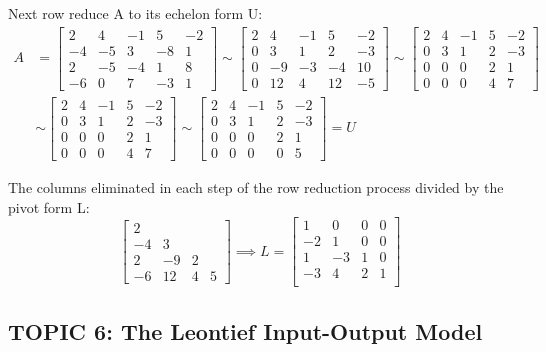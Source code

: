 \documentclass[12pt]{article} %
\begin{document}
Next row reduce A to its echelon form U:
\begin{align*}
	A &= \begin{bmatrix}
		2 & 4 & -1 & 5 & -2\\
		-4 & -5 & 3 & -8 & 1\\
		2 & -5 & -4 & 1 & 8\\
		-6 & 0 & 7 & -3 & 1
	\end{bmatrix} \sim \begin{bmatrix}
		2 & 4 & -1 & 5 & -2\\
		0 & 3 & 1 & 2 & -3\\
		0 & -9 & -3 & -4 & 10\\
		0 & 12 & 4 & 12 & -5
	\end{bmatrix} \sim \begin{bmatrix}
		2 & 4 & -1 & 5 & -2\\
		0 & 3 & 1 & 2 & -3\\
		0 & 0 & 0 & 2 & 1\\
		0 & 0 & 0 & 4 & 7
	\end{bmatrix}\\ 
	&\sim \begin{bmatrix}
		2 & 4 & -1 & 5 & -2\\
		0 & 3 & 1 & 2 & -3\\
		0 & 0 & 0 & 2 & 1\\
		0 & 0 & 0 & 4 & 7
	\end{bmatrix} \sim \begin{bmatrix}
		2 & 4 & -1 & 5 & -2\\
		0 & 3 & 1 & 2 & -3\\
		0 & 0 & 0 & 2 & 1\\
		0 & 0 & 0 & 0 & 5
	\end{bmatrix} = U
\end{align*}

The columns eliminated in each step of the row reduction process divided by the pivot form L:
$$\begin{bmatrix}
	2 & & & \\
	-4 & 3 & & \\
	2 & -9 & 2 & \\
	-6 & 12 & 4 & 5
\end{bmatrix} \implies L = \begin{bmatrix}
	1 & 0 & 0 & 0\\
	-2 & 1 & 0 & 0\\
	1 & -3 & 1 & 0\\
	-3 & 4 & 2 & 1\\
\end{bmatrix}$$


\subsection{TOPIC 6: The Leontief Input-Output Model}
\end{document}
